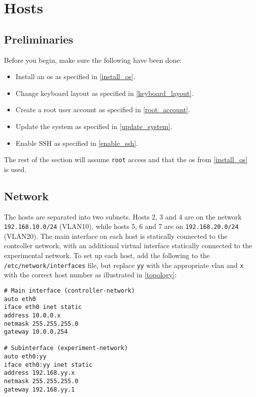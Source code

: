 \chapter{Hosts}


\section{Preliminaries}

Before you begin, make sure the following have been done:

\begin{itemize}
    \item Install an \gls{os} as specified in \ref{install_os}.
    \item Change keyboard layout as specified in \ref{keyboard_layout}.
    \item Create a root user account as specified in \ref{root_account}.
    \item Update the system as specified in \ref{update_system}.
    \item Enable SSH as specified in \ref{enable_ssh}.
\end{itemize}

The rest of the section will assume \lstinline{root} access and that the \gls{os} from \ref{install_os} is used.


\section{Network}

The hosts are separated into two subnets. Hosts 2, 3 and 4 are on the network \lstinline{192.168.10.0/24} (VLAN10), while hosts 5, 6 and 7 are on \lstinline{192.168.20.0/24} (VLAN20). The main interface on each host is statically connected to the controller network, with an additional virtual interface statically connected to the experimental network. To set up each host, add the following to the \lstinline{/etc/network/interfaces} file, but replace \lstinline{yy} with the appropriate \gls{vlan} and \lstinline{x} with the correct host number as illustrated in \ref{topology}:

\begin{lstlisting}
# Main interface (controller-network)
auto eth0
iface eth0 inet static
address 10.0.0.x
netmask 255.255.255.0
gateway 10.0.0.254

# Subinterface (experiment-network)
auto eth0:yy
iface eth0:yy inet static
address 192.168.yy.x
netmask 255.255.255.0
gateway 192.168.yy.1
\end{lstlisting}

